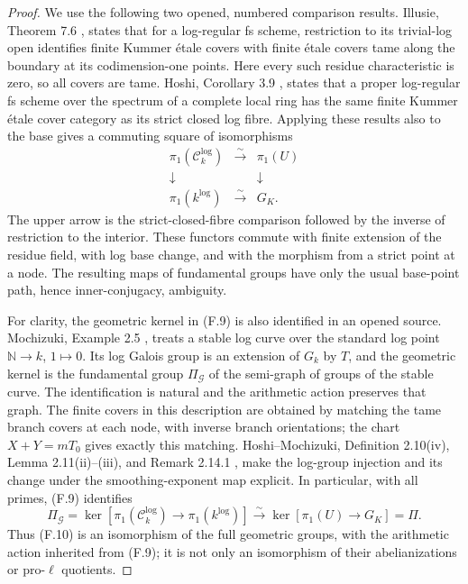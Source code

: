 \begin{proof}
We use the following two opened, numbered comparison results.
Illusie, Theorem 7.6 \cite{CF_Illusie2002}, states that for a
log-regular fs scheme, restriction to its trivial-log open
identifies finite Kummer \'etale covers with finite \'etale covers
tame along the boundary at its codimension-one points.
Here every such residue characteristic is zero, so all covers are
tame. Hoshi, Corollary 3.9 \cite{CF_Hoshi2009}, states that a
proper log-regular fs scheme over the spectrum of a complete local
ring has the same finite Kummer \'etale cover category as its
strict closed log fibre. Applying these results also to the base
gives a commuting square of isomorphisms
\[
 \begin{array}{ccc}
 \pi_1(\mathcal C_k^{\log})&\xrightarrow{\sim}&\pi_1(U)\\
 \downarrow&&\downarrow\\
 \pi_1(k^{\log})&\xrightarrow{\sim}&G_K .
 \end{array}                                                    \tag{F.9}
\]
The upper arrow is the strict-closed-fibre comparison followed by
the inverse of restriction to the interior. These functors commute
with finite extension of the residue field, with log base change,
and with the morphism from a strict point at a node. The resulting
maps of fundamental groups have only the usual base-point path,
hence inner-conjugacy, ambiguity.

For clarity, the geometric kernel in (F.9) is also identified in
an opened source. Mochizuki, Example 2.5
\cite{CF_MochizukiComb2007}, treats a stable log curve over the
standard log point $\mathbb N\to k$, $1\mapsto0$. Its log
Galois group is an extension of $G_k$ by $T$, and the geometric
kernel is the fundamental group $\Pi_{\mathcal G}$ of the
semi-graph of groups of the stable curve. The identification is
natural and the arithmetic action preserves that graph.
The finite covers in this description are obtained by matching
the tame branch covers at each node, with inverse branch
orientations; the chart $X+Y=mT_0$ gives exactly this matching.
Hoshi--Mochizuki, Definition 2.10(iv), Lemma 2.11(ii)--(iii), and
Remark 2.14.1 \cite{CF_HoshiMochizukiNodes}, make the log-group
injection and its change under the smoothing-exponent map
explicit. In particular, with all primes, (F.9) identifies
\[
 \Pi_{\mathcal G}
 =\ker[\pi_1(\mathcal C_k^{\log})\to\pi_1(k^{\log})]
 \xrightarrow{\sim}\ker[\pi_1(U)\to G_K]=\Pi .                 \tag{F.10}
\]
Thus (F.10) is an isomorphism of the full geometric groups, with
the arithmetic action inherited from (F.9); it is not only an
isomorphism of their abelianizations or pro-$\ell$ quotients.


\end{proof}

